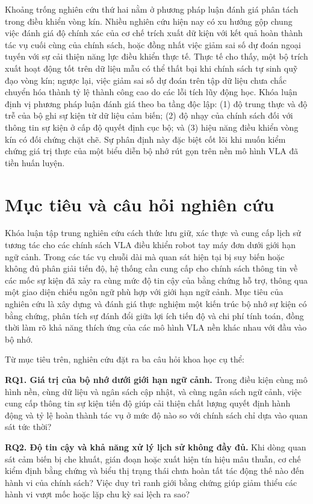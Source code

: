 Khoảng trống nghiên cứu thứ hai nằm ở phương pháp luận đánh giá phân tách trong điều khiển vòng kín. Nhiều nghiên cứu hiện nay có xu hướng gộp chung việc đánh giá độ chính xác của cơ chế trích xuất dữ kiện với kết quả hoàn thành tác vụ cuối cùng của chính sách, hoặc đồng nhất việc giảm sai số dự đoán ngoại tuyến với sự cải thiện năng lực điều khiển thực tế. Thực tế cho thấy, một bộ trích xuất hoạt động tốt trên dữ liệu mẫu có thể thất bại khi chính sách tự sinh quỹ đạo vòng kín; ngược lại, việc giảm sai số dự đoán trên tập dữ liệu chưa chắc chuyển hóa thành tỷ lệ thành công cao do các lỗi tích lũy động học. Khóa luận định vị phương pháp luận đánh giá theo ba tầng độc lập: (1) độ trung thực và độ trễ của bộ ghi sự kiện từ dữ liệu cảm biến; (2) độ nhạy của chính sách đối với thông tin sự kiện ở cấp độ quyết định cục bộ; và (3) hiệu năng điều khiển vòng kín có đối chứng chặt chẽ. Sự phân định này đặc biệt cốt lõi khi muốn kiểm chứng giá trị thực của một biểu diễn bộ nhớ rút gọn trên nền mô hình VLA đã tiền huấn luyện.

\section{Mục tiêu và câu hỏi nghiên cứu}

Khóa luận tập trung nghiên cứu cách thức lưu giữ, xác thực và cung cấp lịch sử tương tác cho các chính sách VLA điều khiển robot tay máy đơn dưới giới hạn ngữ cảnh. Trong các tác vụ chuỗi dài mà quan sát hiện tại bị suy biến hoặc không đủ phân giải tiến độ, hệ thống cần cung cấp cho chính sách thông tin về các mốc sự kiện đã xảy ra cùng mức độ tin cậy của bằng chứng hỗ trợ, thông qua một giao diện chiếu ngôn ngữ phù hợp với giới hạn ngữ cảnh. Mục tiêu của nghiên cứu là xây dựng và đánh giá thực nghiệm một kiến trúc bộ nhớ sự kiện có bằng chứng, phân tích sự đánh đổi giữa lợi ích tiến độ và chi phí tính toán, đồng thời làm rõ khả năng thích ứng của các mô hình VLA nền khác nhau với đầu vào bộ nhớ.

Từ mục tiêu trên, nghiên cứu đặt ra ba câu hỏi khoa học cụ thể:

\textbf{RQ1. Giá trị của bộ nhớ dưới giới hạn ngữ cảnh.} Trong điều kiện cùng mô hình nền, cùng dữ liệu và ngân sách cập nhật, và cùng ngân sách ngữ cảnh, việc cung cấp thông tin sự kiện tiến độ giúp cải thiện chất lượng quyết định hành động và tỷ lệ hoàn thành tác vụ ở mức độ nào so với chính sách chỉ dựa vào quan sát tức thời?

\textbf{RQ2. Độ tin cậy và khả năng xử lý lịch sử không đầy đủ.} Khi dòng quan sát cảm biến bị che khuất, gián đoạn hoặc xuất hiện tín hiệu mâu thuẫn, cơ chế kiểm định bằng chứng và biểu thị trạng thái chưa hoàn tất tác động thế nào đến hành vi của chính sách? Việc duy trì ranh giới bằng chứng giúp giảm thiểu các hành vi vượt mốc hoặc lặp chu kỳ sai lệch ra sao?

